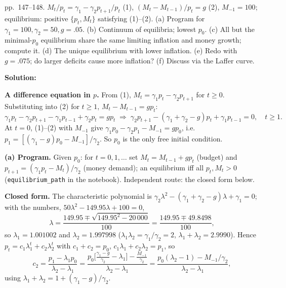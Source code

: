 \documentclass[12pt, letterpaper]{article}
\begin{document}
\begin{tcolorbox}[oddbox,title={Exercise 5.7 \quad Dynamic Laffer curves}]
\begin{tcolorbox}[questionbox]
pp.~147--148. $M_t/p_t=\gamma_1-\gamma_2p_{t+1}/p_t$ (1), $(M_t-M_{t-1})/p_t=g$ (2), $M_{-1}=100$;
equilibrium: positive $\{p_t,M_t\}$ satisfying (1)--(2). (a) Program for
$\gamma_1=100,\gamma_2=50,g=.05$. (b) Continuum of equilibria; lowest $p_0$. (c) All but the minimal-$p_0$
equilibrium share the same limiting inflation and money growth; compute it. (d) The unique
equilibrium with lower inflation. (e) Redo with $g=.075$; do larger deficits cause more inflation?
(f) Discuss via the Laffer curve.
\end{tcolorbox}

\textbf{Solution:}

\textbf{A difference equation in $p$.} From (1), $M_t=\gamma_1p_t-\gamma_2p_{t+1}$ for $t\ge0$.
Substituting into (2) for $t\ge1$, $M_t-M_{t-1}=gp_t$:
\[
\gamma_1p_t-\gamma_2p_{t+1}-\gamma_1p_{t-1}+\gamma_2p_t=gp_t
\;\Longrightarrow\;
\gamma_2p_{t+1}-(\gamma_1+\gamma_2-g)p_t+\gamma_1p_{t-1}=0,\quad t\ge1.
\]
At $t=0$, (1)--(2) with $M_{-1}$ give $\gamma_1p_0-\gamma_2p_1-M_{-1}=gp_0$, i.e.
$p_1=[(\gamma_1-g)p_0-M_{-1}]/\gamma_2$. So $p_0$ is the only free initial condition.

\textbf{(a) Program.} Given $p_0$: for $t=0,1,\dots$ set $M_t=M_{t-1}+gp_t$ (budget) and
$p_{t+1}=(\gamma_1p_t-M_t)/\gamma_2$ (money demand); an equilibrium iff all $p_t,M_t>0$
(\texttt{equilibrium\_path} in the notebook). Independent route: the closed form below.

\textbf{Closed form.} The characteristic polynomial is
$\gamma_2\lambda^2-(\gamma_1+\gamma_2-g)\lambda+\gamma_1=0$; with the numbers,
$50\lambda^2-149.95\lambda+100=0$,
\[
\lambda=\frac{149.95\mp\sqrt{149.95^2-20\,000}}{100}=\frac{149.95\mp49.8498}{100},
\]
so $\lambda_1=1.001002$ and $\lambda_2=1.997998$
($\lambda_1\lambda_2=\gamma_1/\gamma_2=2$, $\lambda_1+\lambda_2=2.9990$). Hence
$p_t=c_1\lambda_1^t+c_2\lambda_2^t$ with $c_1+c_2=p_0$, $c_1\lambda_1+c_2\lambda_2=p_1$, so
\[
c_2=\frac{p_1-\lambda_1p_0}{\lambda_2-\lambda_1}
=\frac{p_0\big[\tfrac{\gamma_1-g}{\gamma_2}-\lambda_1\big]-\tfrac{M_{-1}}{\gamma_2}}{\lambda_2-\lambda_1}
=\frac{p_0(\lambda_2-1)-M_{-1}/\gamma_2}{\lambda_2-\lambda_1},
\]
using $\lambda_1+\lambda_2=1+(\gamma_1-g)/\gamma_2$.


\end{tcolorbox}
\end{document}
